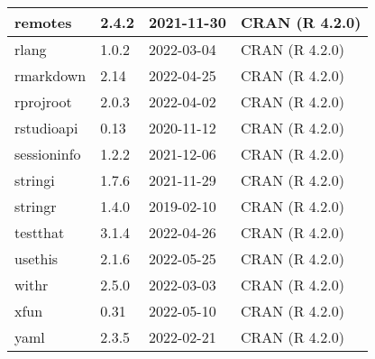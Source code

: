 \documentclass[
]{book}
\theoremstyle{definition}
\theoremstyle{definition}
\theoremstyle{definition}
\theoremstyle{definition}
\theoremstyle{remark}
\begin{document}
\begin{tabular}{l|l|l|l}
\hline
remotes & 2.4.2 & 2021-11-30 & CRAN (R 4.2.0)\\
\hline
rlang & 1.0.2 & 2022-03-04 & CRAN (R 4.2.0)\\
\hline
rmarkdown & 2.14 & 2022-04-25 & CRAN (R 4.2.0)\\
\hline
rprojroot & 2.0.3 & 2022-04-02 & CRAN (R 4.2.0)\\
\hline
rstudioapi & 0.13 & 2020-11-12 & CRAN (R 4.2.0)\\
\hline
sessioninfo & 1.2.2 & 2021-12-06 & CRAN (R 4.2.0)\\
\hline
stringi & 1.7.6 & 2021-11-29 & CRAN (R 4.2.0)\\
\hline
stringr & 1.4.0 & 2019-02-10 & CRAN (R 4.2.0)\\
\hline
testthat & 3.1.4 & 2022-04-26 & CRAN (R 4.2.0)\\
\hline
usethis & 2.1.6 & 2022-05-25 & CRAN (R 4.2.0)\\
\hline
withr & 2.5.0 & 2022-03-03 & CRAN (R 4.2.0)\\
\hline
xfun & 0.31 & 2022-05-10 & CRAN (R 4.2.0)\\
\hline
yaml & 2.3.5 & 2022-02-21 & CRAN (R 4.2.0)\\
\hline
\end{tabular}

  
\end{document}
